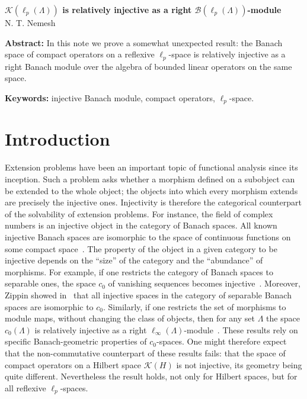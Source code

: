 \documentclass[12pt]{article}
\begin{document}
\begin{center}
    \Large \textbf{$\mathcal{K}(\ell_p(\Lambda))$ is relatively injective as a 
    right $\mathcal{B}(\ell_p(\Lambda))$-module}\\[0.5cm]
    \small {N. T. Nemesh}\\[0.5cm]
\end{center}

\thispagestyle{empty}

\medskip
\textbf{Abstract:} In this note we prove a somewhat unexpected result: the 
Banach space of compact operators on a reflexive $\ell_p$-space is relatively 
injective as a right Banach module over the algebra of bounded linear operators 
on the same space.
\medskip

\textbf{Keywords:} injective Banach module, compact operators, $\ell_p$-space.

\bigskip




\section{Introduction}\label{SectionIntroduction}

Extension problems have been an important topic of functional analysis since its
inception. Such a problem asks whether a morphism defined on a subobject can be 
extended to the whole object; the objects into which every morphism extends are 
precisely the injective ones. Injectivity is therefore the categorical 
counterpart of the solvability of extension problems. For instance, the field of 
complex numbers is an injective object in the category of Banach spaces. All known injective Banach 
spaces are isomorphic to the space of continuous functions on some compact
space~\cite{BlascIvorConstrInjSpCK}. The property of the object in a given 
category to be injective depends on the ``size'' of the category and 
the ``abundance'' of morphisms. For example, if one restricts the category of 
Banach spaces to separable ones, the space $c_0$ of vanishing sequences becomes 
injective~\cite{SobProjmOnc0}. Moreover, Zippin showed 
in~\cite{ZipSepExtProbm} that all injective spaces in the category of separable 
Banach spaces are isomorphic to $c_0$. Similarly, if one restricts the set of 
morphisms to module maps, without changing the class of objects, then for any 
set $\Lambda$ the space $c_0(\Lambda)$ is relatively injective as a 
right $\ell_\infty(\Lambda)$-module~\cite{NemRelInjC0SmodC0S}. These 
results rely on specific Banach-geometric properties of $c_0$-spaces. One might 
therefore expect that the non-commutative counterpart of these results fails: 
that the space of compact operators on a Hilbert space $\mathcal{K}(H)$ is not 
injective, its geometry being quite different. Nevertheless the result holds, 
not only for Hilbert spaces, but for all reflexive $\ell_p$-spaces.
\end{document}
